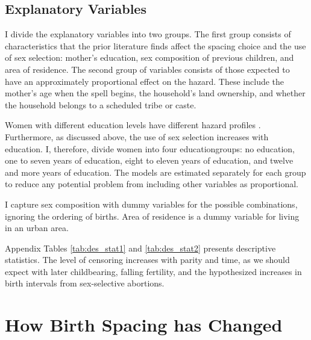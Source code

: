 \documentclass[12pt,letterpaper]{article}
\begin{document}
\subsection{Explanatory Variables}

I divide the explanatory variables into two groups.
The first group consists of characteristics that the prior literature finds affect 
the spacing choice and the use of sex selection:
mother's education, sex composition of previous children, and area of residence.
The second group of variables consists of those expected to have an approximately 
proportional effect on the hazard.
These include the mother's age when the spell begins, the household's
land ownership, and whether the household belongs to a scheduled tribe
or caste.

Women with different education levels have different hazard profiles
\citep{Whitworth2002,Bhalotra2008,Kim2010}.
Furthermore, as discussed above, the use of sex selection increases with education.
I, therefore, divide women into four educationgroups: no
education, one to seven years of education, eight to eleven years of education,
and twelve and more years of education.
The models are estimated separately for each group to reduce any
potential problem from including other variables as proportional.

I capture sex composition with dummy variables for the
possible combinations, ignoring the ordering of births.
Area of residence is a dummy variable for living in an urban area.


Appendix Tables \ref{tab:des_stat1} and \ref{tab:des_stat2} presents descriptive 
statistics.
The level of censoring increases with parity and time, as we should expect with later 
childbearing, falling fertility, and the hypothesized increases in birth intervals from 
sex-selective abortions.



\section{How Birth Spacing has Changed\label{sec:results}}
\end{document}
